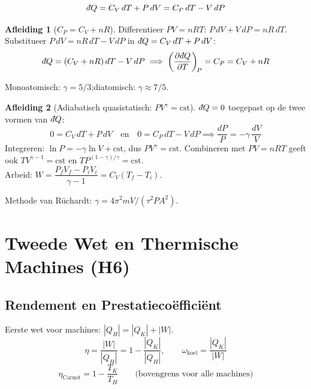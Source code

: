 \documentclass[a4paper,twoside,10pt]{article}
\theoremstyle{definition}
\newtheorem{derivation}{Afleiding}[section]
\newcommand{\dbar}{{\mkern+3mu\mathchar'26\mkern-12mu d}}
\newcommand{\pd}[3][]{\left(\dfrac{\partial #2}{\partial #3}\right)_{\!#1}}
\begin{document}
\[
  \dbar Q = C_V\,dT + P\,dV = C_P\,dT - V\,dP
\]

\begin{derivation}[$C_P = C_V + nR$]
Differentieer $PV=nRT$: $P\,dV + V\,dP = nR\,dT$. Substitueer $P\,dV = nR\,dT - V\,dP$
in $\dbar Q = C_V\,dT + P\,dV$:
\[
  \dbar Q = (C_V + nR)\,dT - V\,dP
  \implies \pd[P]{\dbar Q}{T} = C_P = C_V + nR
\]
\end{derivation}

Monoatomisch: $\gamma=5/3$;\quad diatomisch: $\gamma\approx7/5$.

\begin{derivation}[Adiabatisch quasistatisch: $PV^\gamma = \mathrm{cst}$]
$\dbar Q=0$ toegepast op de twee vormen van $\dbar Q$:
\[
  0 = C_V\,dT + P\,dV \quad\text{en}\quad 0 = C_P\,dT - V\,dP
  \implies \frac{dP}{P} = -\gamma\,\frac{dV}{V}
\]
Integreren: $\ln P = -\gamma\ln V + \mathrm{cst}$, dus $\boxed{PV^\gamma = \mathrm{cst}}$.
Combineren met $PV = nRT$ geeft ook $TV^{\gamma-1}=\mathrm{cst}$ en $TP^{(1-\gamma)/\gamma}=\mathrm{cst}$.\\
Arbeid: $W = \dfrac{P_fV_f - P_iV_i}{\gamma-1} = C_V(T_f-T_i)$.
\end{derivation}

Methode van Rüchardt: $\gamma = 4\pi^2 mV/(\tau^2 P A^2)$.

\section{Tweede Wet en Thermische Machines (H6)}

\subsection{Rendement en Prestatiecoëfficiënt}

Eerste wet voor machines: $|Q_H| = |Q_K| + |W|$.
\[
  \eta = \frac{|W|}{|Q_H|} = 1 - \frac{|Q_K|}{|Q_H|},
  \qquad
  \omega_{\text{koel}} = \frac{|Q_K|}{|W|}
\]
\[
  \boxed{\eta_{\mathrm{Carnot}} = 1 - \frac{T_K}{T_H}}
  \qquad\text{(bovengrens voor alle machines)}
\]
\end{document}
